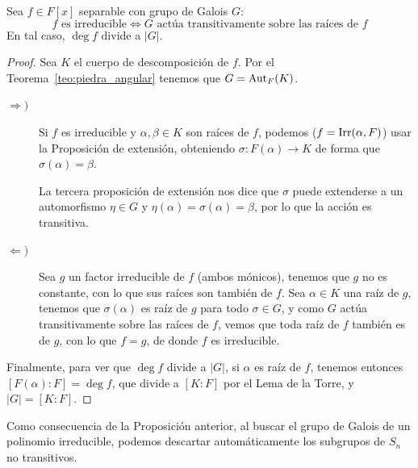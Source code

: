 \begin{prop}\label{prop:transitividad_galois}
    Sea $f\in F[x]$ separable con grupo de Galois $G$:
    \begin{equation*}
        f\text{\ es irreducible} \Longleftrightarrow G\text{\ actúa transitivamente sobre las raíces de\ } f
    \end{equation*}
    En tal caso, $\deg f$ divide a $|G|$.
    \begin{proof}
        Sea $K$ el cuerpo de descomposición de $f$. Por el Teorema~\ref{teo:piedra_angular} tenemos que $G = \operatorname{Aut}_F(K)$.
        \begin{description}
            \item [$\Longrightarrow )$] Si $f$ es irreducible y $\alpha,\beta\in K$ son raíces de $f$, podemos ($f = \operatorname{Irr}(\alpha,F)$) usar la Proposición de extensión, obteniendo $\sigma:F(\alpha)\to K$ de forma que $\sigma(\alpha) = \beta$.

                La tercera proposición de extensión nos dice que $\sigma$ puede extenderse a un automorfismo $\eta\in G$ y $\eta(\alpha) = \sigma(\alpha) = \beta$, por lo que la acción es transitiva.
            \item [$\Longleftarrow )$] Sea $g$ un factor irreducible de $f$ (ambos mónicos), tenemos que $g$ no es constante, con lo que sus raíces son también de $f$. Sea $\alpha\in K$ una raíz de $g$, tenemos que $\sigma(\alpha)$ es raíz de $g$ para todo $\sigma\in G$, y como $G$ actúa transitivamente sobre las raíces de $f$, vemos que toda raíz de $f$ también es de $g$, con lo que $f=g$, de donde $f$ es irreducible.
        \end{description}
        Finalmente, para ver que $\deg f$ divide a $|G|$, si $\alpha$ es raíz de $f$, tenemos entonces $[F(\alpha):F] = \deg f$, que divide a $[K:F]$ por el Lema de la Torre, y $|G| = [K:F]$.
    \end{proof}
\end{prop}

Como consecuencia de la Proposición anterior, al buscar el grupo de Galois de un polinomio irreducible, podemos descartar automáticamente los subgrupos de $S_n$ no transitivos.

